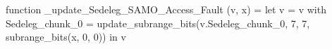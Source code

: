 function _update_Sedeleg_SAMO_Access_Fault (v, x) = let v = { v with Sedeleg_chunk_0 = update_subrange_bits(v.Sedeleg_chunk_0, 7, 7, subrange_bits(x, 0, 0)) } in
  v

